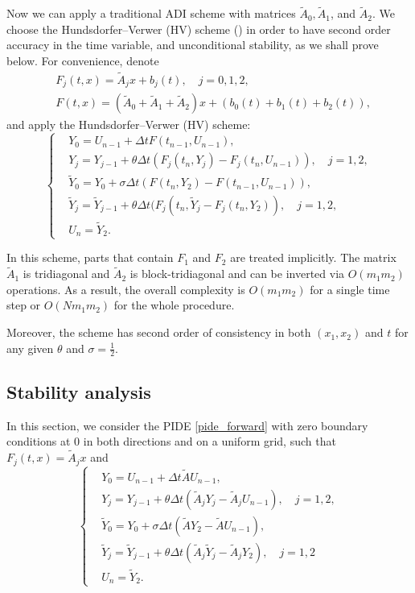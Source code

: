 {Now we can apply a traditional ADI scheme with matrices $\tilde{A}_0, \tilde{A}_1$, and $\tilde{A}_2$. We choose the Hundsdorfer--Verwer (HV) scheme (\cite{HV}) in order to have second order accuracy in the time variable, and unconditional stability, as we shall prove below. For convenience, denote
\begin{align}
	& F_j(t, x) = \tilde{A}_j x + b_j(t), \quad j = 0, 1, 2, \label{F_j}\\
	& F(t, x) = (\tilde{A}_0 + \tilde{A}_1 + \tilde{A}_2 ) x + (b_0(t) + b_1(t) + b_2(t)),
\end{align}
and apply the Hundsdorfer--Verwer (HV) scheme:
\begin{equation}
	\label{HV_scheme}
	\left\{
	\begin{aligned}
	&	Y_0 = U_{n-1} + \Delta t F(t_{n-1}, U_{n-1}), \\
	&	Y_j = Y_{j-1} + \theta \Delta t (F_j(t_n, Y_j) - F_j(t_n, U_{n-1})), \quad j = 1, 2, \\
	&	\tilde{Y}_0 = Y_0 + \sigma \Delta t (F(t_n, Y_2) - F(t_{n-1}, U_{n-1})), \\
	&	\tilde{Y}_j = \tilde{Y}_{j-1} + \theta \Delta t (F_j(t_n, \tilde{Y}_j - F_j(t_n, Y_2)), \quad j = 1, 2, \\
	&	U_n = \tilde{Y}_2.
	\end{aligned}
	\right.
\end{equation}

In this scheme, parts that contain $F_1$ and $F_2$ are treated implicitly. The matrix $\tilde{A}_1$ is tridiagonal and $\tilde{A}_2$ is block-tridiagonal and can be inverted via $O(m_1 m_2)$ operations.  As a result, the overall complexity is $O(m_1 m_2)$ for a single time step or $O(N m_1 m_2)$ for the whole procedure.

Moreover, the scheme has second order of consistency in both $(x_1, x_2)$ and $t$ for any given $\theta$ and $\sigma = \frac{1}{2}$. 

\subsection{Stability analysis}
In this section, we consider the PIDE \eqref{pide_forward} with zero boundary conditions at $0$ in both directions and on a uniform grid,
such that $F_j(t, x) = \tilde{A}_j x$ and
\begin{equation}
	\label{HV_nobound}
	\left\{
	\begin{aligned}
	&	Y_0 = U_{n-1} + \Delta t \tilde{A} U_{n-1}, \\
	&	Y_j = Y_{j-1} + \theta \Delta t (\tilde{A}_j Y_j - \tilde{A}_j U_{n-1}),\quad j = 1, 2, \\
	&	\tilde{Y}_0 = Y_0 + \sigma \Delta t (\tilde{A} Y_2- \tilde{A} U_{n-1}), \\
	&	\tilde{Y}_j = \tilde{Y}_{j-1} + \theta \Delta t (\tilde{A}_j\tilde{Y}_j - \tilde{A}_j Y_2), \quad j = 1, 2 \\
	&	U_n = \tilde{Y}_2.
	\end{aligned}
	\right.
\end{equation}

}
